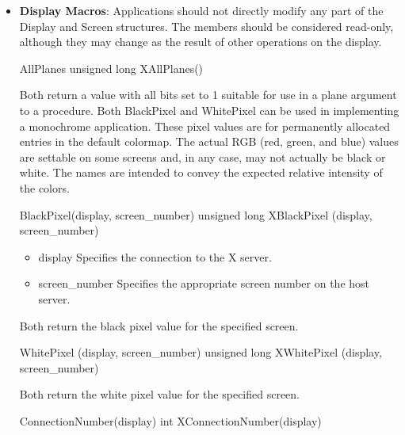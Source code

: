 \documentclass{report}
\begin{document}
\begin{itemize}
\begin{itemize}
                \item DirectColor
            \end{itemize}
            \bigbreak \noindent 
            A \texttt{Visual*} is an Xlib object describing one supported color interpretation scheme.
        \item \textbf{Display Macros}: Applications should not directly modify any part of the Display and Screen structures. The members should be considered read-only, although they may change as the result of other operations on the display.
            \bigbreak \noindent 
            \begin{cppcode}
            AllPlanes
            unsigned long XAllPlanes()
            \end{cppcode}
            \bigbreak \noindent 
            Both return a value with all bits set to 1 suitable for use in a plane argument to a procedure. 
            \bigbreak \noindent 
            Both BlackPixel and WhitePixel can be used in implementing a monochrome application. These pixel values are for permanently allocated entries in the default colormap. The actual RGB (red, green, and blue) values are settable on some screens and, in any case, may not actually be black or white. The names are intended to convey the expected relative intensity of the colors.
            \begin{cppcode}
            BlackPixel(display, screen_number) 
            unsigned long XBlackPixel (display, screen_number)
            \end{cppcode}
            \begin{itemize}
                \item display Specifies the connection to the X server.
                \item screen\_number Specifies the appropriate screen number on the host server.
            \end{itemize}
            Both return the black pixel value for the specified screen.
            \bigbreak \noindent 
            \begin{cppcode}
                WhitePixel (display, screen_number)
                unsigned long XWhitePixel (display, screen_number)
            \end{cppcode}
            \bigbreak \noindent 
            Both return the white pixel value for the specified screen.
            \bigbreak \noindent 
            \begin{cppcode}
            ConnectionNumber(display)
            int XConnectionNumber(display)

\end{cppcode}
\end{itemize}
\end{document}
